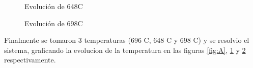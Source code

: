 \documentclass[11pt,a4paper]{article}
\begin{document}
\begin{figure}[H]
	\caption{Evolución de 648\degree C}
    \label{fig:B}
\end{figure}

\begin{figure}[H]
    \caption{Evolución de 698\degree C}
	\label{fig:C}
\end{figure}

Finalmente se tomaron 3 temperaturas (696 \degree C, 648 \degree C y 698 \degree C) y se resolvio el sistema, graficando la evolucion de la temperatura en las figuras \ref{fig:A}, \ref{fig:B} y \ref{fig:C} respectivamente.
\end{document}
